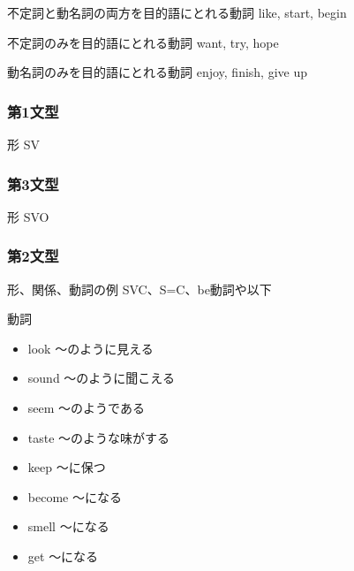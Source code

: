 \documentclass[10pt]{jsarticle}
\newcommand{\answer}[2]{{\color{orange}#2}}
\newcommand{\answer}[2]{\vspace{#1mm}}
\begin{document}
\begin{itembox}[l]{不定詞と動名詞の両方を目的語にとれる動詞}
	\answer{8}{like, start, begin}
\end{itembox}

\begin{itembox}[l]{不定詞のみを目的語にとれる動詞}
	\answer{8}{want, try, hope}
\end{itembox}

\begin{itembox}[l]{動名詞のみを目的語にとれる動詞}
	\answer{8}{enjoy, finish, give up}
\end{itembox}


\newpage


\begin{multicols}{2}
	\subsubsection*{第1文型}
	\begin{itembox}[l]{形}
		\answer{8}{SV}
	\end{itembox}

	\subsubsection*{第3文型}
	\begin{itembox}[l]{形}
		\answer{8}{SVO}
	\end{itembox}

\end{multicols}

\subsubsection*{第2文型}
\begin{itembox}[l]{形、関係、動詞の例}
	\answer{8}{SVC、S=C、be動詞や以下}
\end{itembox}

\begin{itembox}[l]{動詞}

	\begin{multicols}{3}
		\begin{itemize}
			\item look \answer{5}{〜のように見える}
			\item sound \answer{5}{〜のように聞こえる}
			\item seem \answer{5}{〜のようである}
			\item taste \answer{5}{〜のような味がする}
			\item keep \answer{5}{〜に保つ}
			\item become \answer{5}{〜になる}
			\item smell \answer{5}{〜になる}
			\item get \answer{5}{〜になる}
		\end{itemize}
	\end{multicols}
\end{itembox}
\end{document}
